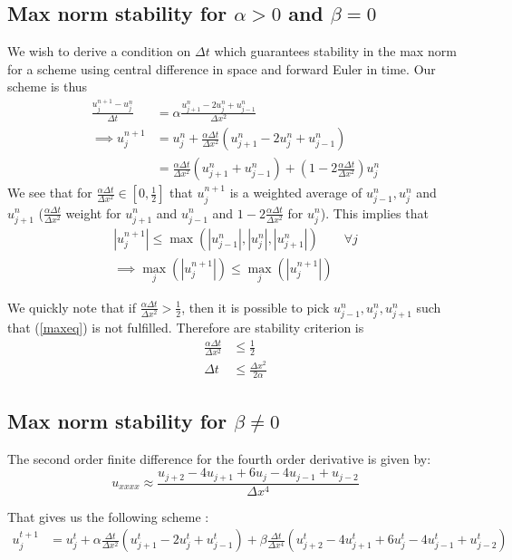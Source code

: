 \subsection{Max norm stability for $\alpha>0$ and $\beta=0$}
We wish to derive a condition on $\Delta t$ which guarantees stability in the max norm for a scheme using central difference in space and forward Euler in time. Our scheme is thus
\begin{align*}
\frac{u_j^{n+1} - u_j^n}{\Delta t}&=\alpha \frac{u_{j+1}^n -2u_j^n+u_{j-1}^n}{\Delta x^2} \\
\implies u_j^{n+1} &= u_j^n + \frac{\alpha \Delta t}{\Delta x^2} (u_{j+1}^n -2u_j^n+u_{j-1}^n) \\
&=  \frac{\alpha \Delta t}{\Delta x^2} (u_{j+1}^n +u_{j-1}^n) + (1-2\frac{\alpha \Delta t}{\Delta x^2})u_j^n 
\end{align*}
We see that for $\frac{\alpha \Delta t}{\Delta x^2} \in [0,\frac{1}{2}]$ that $u_j^{n+1}$ is a weighted average of $u_{j-1}^n,u_j^n$ and $u_{j+1}^n$ ($\frac{\alpha \Delta t}{\Delta x^2}$ weight for $u_{j+1}^n$ and $u_{j-1}^n$ and $1-2\frac{\alpha \Delta t}{\Delta x^2}$ for $u_j^n$).
This implies that
\begin{align}
|u_j^{n+1}| \leq \max(|u_{j-1}^n|,|u_j^n|,|u_{j+1}^n|) \qquad \forall j \label{maxeq} \\
\implies \max_j (|u_j^{n+1}|) \leq \max_j (|u_j^{n+1}|) \nonumber
\end{align}

We quickly note that if $\frac{\alpha \Delta t}{\Delta x^2}>\frac{1}{2}$, then it is possible to pick $u_{j-1}^n,u_j^n,u_{j+1}^n$ such that (\ref{maxeq}) is not fulfilled. Therefore are stability criterion is 
\begin{align*}
\frac{\alpha \Delta t}{\Delta x^2} &\leq \frac{1}{2} \\
\Delta t &\leq \frac{\Delta x^2}{2\alpha}
\end{align*}

\subsection{Max norm stability for $\beta \neq 0$}
The second order finite difference for the fourth order derivative is given by:
$$u_{xxxx} \approx \frac{u_{j+2}-4u_{j+1}+6u_j-4u_{j-1}+u_{j-2}}{\Delta x^4}$$

That gives us the following scheme : 
\begin{align*}
u_j^{t+1} &= u_j^t + \alpha\frac{\Delta t}{\Delta x^2} (u_{j+1}^t-2u_j^t+u_{j-1}^t)+ \beta \frac{\Delta t}{\Delta x^4}(u_{j+2}^t-4u_{j+1}^t+6u_j^t-4u_{j-1}^t+u_{j-2}^t)
\end{align*}

